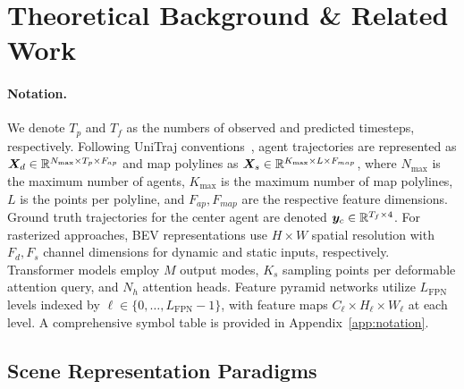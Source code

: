 \section{Theoretical Background \& Related Work}
\label{sec:background}

\paragraph{Notation.} We denote \(T_p\) and \(T_f\) as the numbers of observed and predicted timesteps, respectively. Following UniTraj conventions~\cite{unitrajFeng2024}, agent trajectories are represented as \(\boldsymbol{X}_d \in \mathbb{R}^{N_{\max} \times T_p \times F_{ap}}\) and map polylines as \(\boldsymbol{X}_s \in \mathbb{R}^{K_{\max} \times L \times F_{map}}\), where \(N_{\max}\) is the maximum number of agents, \(K_{\max}\) is the maximum number of map polylines, \(L\) is the points per polyline, and \(F_{ap}, F_{map}\) are the respective feature dimensions. Ground truth trajectories for the center agent are denoted \(\boldsymbol{y}_c \in \mathbb{R}^{T_f \times 4}\). For rasterized approaches, BEV representations use \(H \times W\) spatial resolution with \(F_d, F_s\) channel dimensions for dynamic and static inputs, respectively. Transformer models employ \(M\) output modes, \(K_s\) sampling points per deformable attention query, and \(N_h\) attention heads. Feature pyramid networks utilize \(L_{\text{FPN}}\) levels indexed by \(\ell \in \{0,\dots,L_{\text{FPN}}-1\}\), with feature maps \(C_\ell \times H_\ell \times W_\ell\) at each level. A comprehensive symbol table is provided in Appendix~\ref{app:notation}.


\subsection{Scene Representation Paradigms}
\label{ssec:scene_repr}

